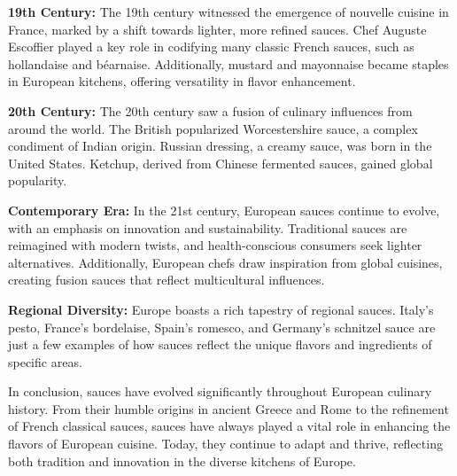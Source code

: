 \textbf{19th Century:} The 19th century witnessed the emergence of nouvelle cuisine in France, marked by a shift towards lighter, more refined sauces. Chef Auguste Escoffier played a key role in codifying many classic French sauces, such as hollandaise and béarnaise. Additionally, mustard and mayonnaise became staples in European kitchens, offering versatility in flavor enhancement.

\textbf{20th Century:} The 20th century saw a fusion of culinary influences from around the world. The British popularized Worcestershire sauce, a complex condiment of Indian origin. Russian dressing, a creamy sauce, was born in the United States. Ketchup, derived from Chinese fermented sauces, gained global popularity.

\textbf{Contemporary Era:} In the 21st century, European sauces continue to evolve, with an emphasis on innovation and sustainability. Traditional sauces are reimagined with modern twists, and health-conscious consumers seek lighter alternatives. Additionally, European chefs draw inspiration from global cuisines, creating fusion sauces that reflect multicultural influences.

\textbf{Regional Diversity:} Europe boasts a rich tapestry of regional sauces. Italy's pesto, France's bordelaise, Spain's romesco, and Germany's schnitzel sauce are just a few examples of how sauces reflect the unique flavors and ingredients of specific areas.

In conclusion, sauces have evolved significantly throughout European culinary history. From their humble origins in ancient Greece and Rome to the refinement of French classical sauces, sauces have always played a vital role in enhancing the flavors of European cuisine. Today, they continue to adapt and thrive, reflecting both tradition and innovation in the diverse kitchens of Europe.

